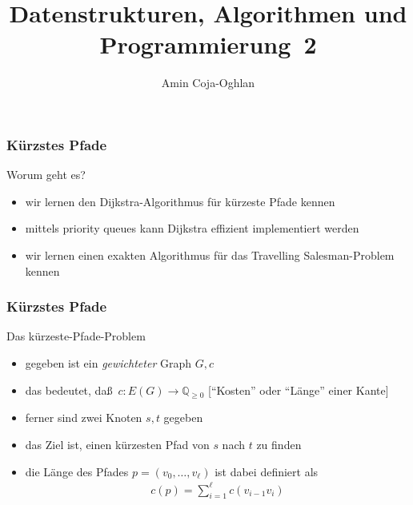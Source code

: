 \documentclass[aspectratio=1610, 11pt]{beamer}
\title{Datenstrukturen, Algorithmen und Programmierung~2}
\author[A.~Coja-Oghlan]{Amin Coja-Oghlan}
\institute[DAP2]{Lehrstuhl Informatik 2\\Fakult\"at f\"ur Informatik}
\newcommand\QQ{\mathbb Q}
\newcommand{\mytitle}{K\"urzstes Pfade}
\begin{document}
\frame[plain]{\titlepage}

\begin{frame}\frametitle{\mytitle}
	\begin{exampleblock}{Worum geht es?}
		\begin{itemize}
			\item wir lernen den Dijkstra-Algorithmus f\"ur k\"urzeste Pfade kennen
			\item mittels priority queues kann Dijkstra effizient implementiert  werden
			\item wir lernen einen exakten Algorithmus f\"ur das Travelling Salesman-Problem kennen
		\end{itemize}
	\end{exampleblock}
\end{frame}

\begin{frame}\frametitle{\mytitle}
	\begin{block}{Das k\"urzeste-Pfade-Problem}
 		\begin{itemize}
			\item gegeben ist ein \emph{gewichteter} Graph $G,c$
			\item das bedeutet, da\ss\ $c:E(G)\to\QQ_{\geq0}$ \hfill[``Kosten'' oder ``L\"ange'' einer Kante]
			\item ferner sind zwei Knoten $s,t$ gegeben
			\item das Ziel ist, einen k\"urzesten Pfad von $s$ nach $t$ zu finden
			\item die \alert{L\"ange} des Pfades $p=(v_0,\ldots,v_\ell)$ ist dabei definiert als
				\begin{align*}
					c(p)=\sum_{i=1}^\ell c(v_{i-1}v_i)
				\end{align*}
		\end{itemize}
	\end{block}
\end{frame}
\end{document}
